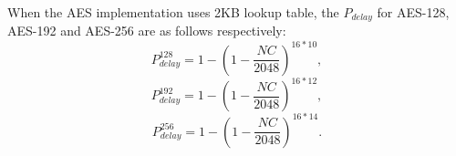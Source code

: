 
When the AES implementation uses 2KB lookup table, the $P_{delay}$ for AES-128, AES-192 and AES-256 are as follows respectively:
\begin{equation}
    P_{delay}^{128} = 1- (1-\frac{NC}{2048})^{16*10},
\end{equation}
\begin{equation}
    P_{delay}^{192} = 1- (1-\frac{NC}{2048})^{16*12},
\end{equation}
\begin{equation}
    P_{delay}^{256} = 1- (1-\frac{NC}{2048})^{16*14}.
\end{equation} 